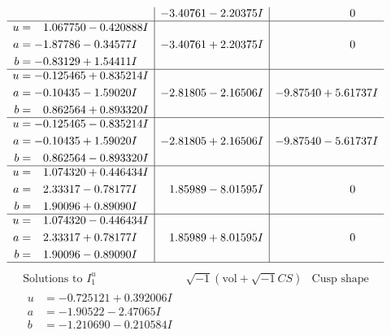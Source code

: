 \documentclass[1p]{elsarticle_modified}
\theoremstyle{definition}
\newcommand{\I}{\sqrt{-1}}
\begin{document}
$$\begin{array}{c|c|c}
 & -3.40761 - 2.20375 I & \phantom{-0.000000 } 0 \\ \hline\begin{aligned}
u &= \phantom{-}1.067750 - 0.420888 I \\
a &= -1.87786 - 0.34577 I \\
b &= -0.83129 + 1.54411 I\end{aligned}
 & -3.40761 + 2.20375 I & \phantom{-0.000000 } 0 \\ \hline\begin{aligned}
u &= -0.125465 + 0.835214 I \\
a &= -0.10435 - 1.59020 I \\
b &= \phantom{-}0.862564 + 0.893320 I\end{aligned}
 & -2.81805 - 2.16506 I & -9.87540 + 5.61737 I \\ \hline\begin{aligned}
u &= -0.125465 - 0.835214 I \\
a &= -0.10435 + 1.59020 I \\
b &= \phantom{-}0.862564 - 0.893320 I\end{aligned}
 & -2.81805 + 2.16506 I & -9.87540 - 5.61737 I \\ \hline\begin{aligned}
u &= \phantom{-}1.074320 + 0.446434 I \\
a &= \phantom{-}2.33317 - 0.78177 I \\
b &= \phantom{-}1.90096 + 0.89090 I\end{aligned}
 & \phantom{-}1.85989 - 8.01595 I & \phantom{-0.000000 } 0 \\ \hline\begin{aligned}
u &= \phantom{-}1.074320 - 0.446434 I \\
a &= \phantom{-}2.33317 + 0.78177 I \\
b &= \phantom{-}1.90096 - 0.89090 I\end{aligned}
 & \phantom{-}1.85989 + 8.01595 I & \phantom{-0.000000 } 0\\
 \hline 
 \end{array}$$\newpage$$\begin{array}{c|c|c}  
\text{Solutions to }I^u_{1}& \I (\text{vol} + \sqrt{-1}CS) & \text{Cusp shape}\\
 \hline 
\begin{aligned}
u &= -0.725121 + 0.392006 I \\
a &= -1.90522 - 2.47065 I \\
b &= -1.210690 - 0.210584 I\end{aligned}

\end{array}$$
\end{document}
